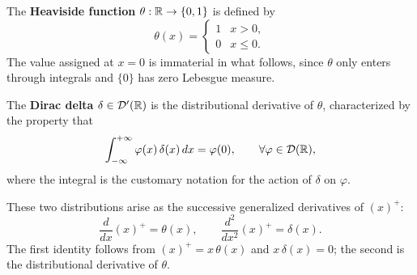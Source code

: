 \begin{definition}
The \textbf{Heaviside function} $\theta : \mathbb{R} \to \{0,1\}$ is defined by
\begin{equation*}
    \theta(x) =
    \begin{cases}
        1 & x > 0, \\
        0 & x \leq 0.
    \end{cases}
\end{equation*}
The value assigned at $x = 0$ is immaterial in what follows,
since $\theta$ only enters through integrals and $\{0\}$ has zero Lebesgue measure.
\end{definition}

\begin{definition}
The \textbf{Dirac delta} $\delta \in \mathcal{D}'(\mathbb{R})$ is the distributional derivative of $\theta$,
characterized by the property that
\begin{equation*}
    \int_{-\infty}^{+\infty} \varphi(x)\,\delta(x)\,dx = \varphi(0),
    \qquad \forall \varphi \in \mathcal{D}(\mathbb{R}),
\end{equation*}
where the integral is the customary notation for the action of $\delta$ on $\varphi$.
\end{definition}

These two distributions arise as the successive generalized derivatives of $(x)^+$:
\begin{equation}\label{eq:heaviside_delta_max}
    \frac{d}{dx}(x)^+ = \theta(x),
    \qquad
    \frac{d^2}{dx^2}(x)^+ = \delta(x).
\end{equation}
The first identity follows from $(x)^+ = x\,\theta(x)$ and $x\,\delta(x) = 0$;
the second is the distributional derivative of $\theta$.

